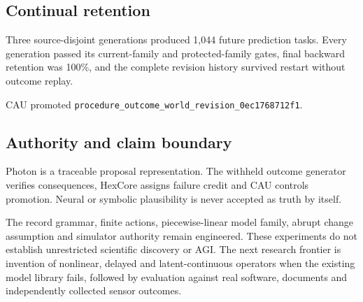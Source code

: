 \subsection{Continual retention}

Three source-disjoint generations produced 1,044 future prediction tasks.
Every generation passed its current-family and protected-family gates, final
backward retention was 100\%, and the complete revision history survived
restart without outcome replay.

CAU promoted
\texttt{procedure\_outcome\_world\_revision\_0ec1768712f1}.

\subsection{Authority and claim boundary}

Photon is a traceable proposal representation.  The withheld outcome generator
verifies consequences, HexCore assigns failure credit and CAU controls
promotion.  Neural or symbolic plausibility is never accepted as truth by
itself.

The record grammar, finite actions, piecewise-linear model family, abrupt
change assumption and simulator authority remain engineered.  These experiments
do not establish unrestricted scientific discovery or AGI.  The next research
frontier is invention of nonlinear, delayed and latent-continuous operators when
the existing model library fails, followed by evaluation against real software,
documents and independently collected sensor outcomes.
